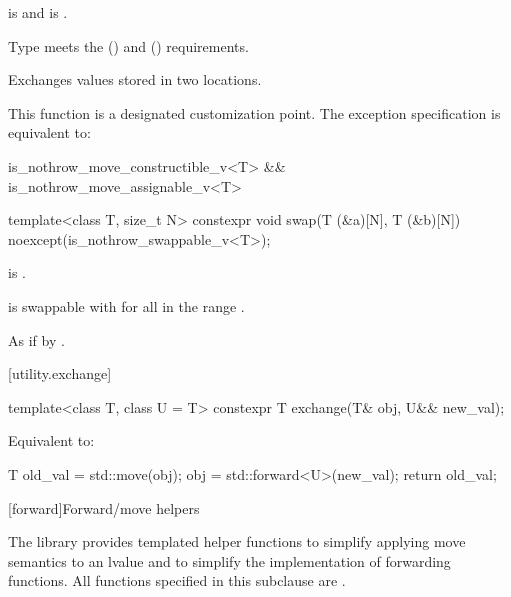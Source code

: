 \begin{itemdescr}
\pnum
\constraints
{} is  and
 is .

\pnum
\expects
Type
meets the
 ()
and
 ()
requirements.

\pnum
\effects
Exchanges values stored in two locations.

\pnum
\remarks
This function
is a designated customization point.
The exception specification is equivalent to:
\begin{codeblock}
is_nothrow_move_constructible_v<T> && is_nothrow_move_assignable_v<T>
\end{codeblock}
\end{itemdescr}

%
\begin{itemdecl}
template<class T, size_t N>
  constexpr void swap(T (&a)[N], T (&b)[N]) noexcept(is_nothrow_swappable_v<T>);
\end{itemdecl}

\begin{itemdescr}
\pnum
\constraints
{} is .

\pnum
\expects
{} is swappable with 
for all  in the range .

\pnum
\effects
As if by .
\end{itemdescr}

[utility.exchange]{}

%
\begin{itemdecl}
template<class T, class U = T>
  constexpr T exchange(T& obj, U&& new_val);
\end{itemdecl}

\begin{itemdescr}
\pnum
\effects
Equivalent to:
\begin{codeblock}
T old_val = std::move(obj);
obj = std::forward<U>(new_val);
return old_val;
\end{codeblock}
\end{itemdescr}


[forward]{Forward/move helpers}

\pnum
The library provides templated helper functions to simplify
applying move semantics to an lvalue and to simplify the implementation
of forwarding functions.
%
%
%
All functions specified in this subclause are .

